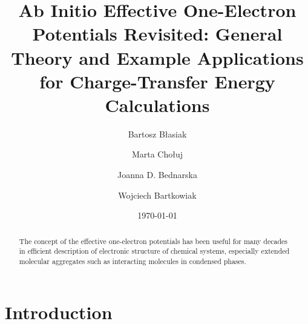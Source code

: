 


\title{Ab Initio Effective One-Electron Potentials Revisited:
General Theory and Example Applications for Charge-Transfer Energy Calculations}

\author{Bartosz B{\l}asiak}

\author{Marta Cho{\l}uj} 
\author{Joanna D. Bednarska}
\author{Wojciech Bartkowiak}


\date{\today}

\begin{abstract}
The concept of the effective one-electron potentials has been useful for many decades
in efficient description of electronic structure of chemical systems, especially extended
molecular aggregates such as interacting molecules in condensed phases. 
\end{abstract}

\pacs{}

\maketitle

\tableofcontents


\section{\label{ss.5.2}Introduction}

